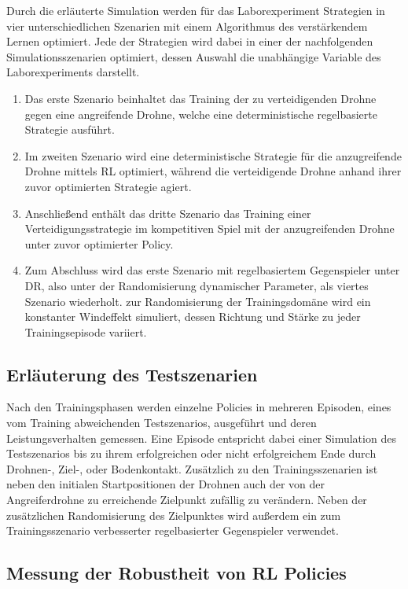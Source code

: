 Durch die erläuterte Simulation werden für das Laborexperiment Strategien in vier unterschiedlichen Szenarien mit einem Algorithmus des verstärkendem Lernen optimiert.
Jede der Strategien wird dabei in einer der nachfolgenden Simulationsszenarien optimiert, dessen Auswahl die unabhängige Variable des Laborexperiments darstellt.
\begin{enumerate}
    \item Das erste Szenario beinhaltet das Training der zu verteidigenden Drohne gegen eine angreifende Drohne, welche eine deterministische regelbasierte Strategie ausführt.
    \item Im zweiten Szenario wird eine deterministische Strategie für die anzugreifende Drohne mittels RL optimiert, während die verteidigende Drohne anhand ihrer zuvor optimierten Strategie agiert.
    \item Anschließend enthält das dritte Szenario das Training einer Verteidigungsstrategie im kompetitiven Spiel mit der anzugreifenden Drohne unter zuvor optimierter Policy.
    \item Zum Abschluss wird das erste Szenario mit regelbasiertem Gegenspieler unter DR, also unter der Randomisierung dynamischer Parameter, als viertes Szenario wiederholt. 
    zur Randomisierung der Trainingsdomäne wird ein konstanter Windeffekt simuliert, dessen Richtung und Stärke zu jeder Trainingsepisode variiert. 
\end{enumerate}

\subsection{Erläuterung des Testszenarien}

Nach den Trainingsphasen werden einzelne Policies in mehreren Episoden, eines vom Training abweichenden Testszenarios, ausgeführt und deren Leistungsverhalten gemessen.
Eine Episode entspricht dabei einer Simulation des Testszenarios bis zu ihrem erfolgreichen oder nicht erfolgreichem Ende durch Drohnen-, Ziel-, oder Bodenkontakt.
Zusätzlich zu den Trainingsszenarien ist neben den initialen Startpositionen der Drohnen auch der von der Angreiferdrohne zu erreichende Zielpunkt zufällig zu verändern.
Neben der zusätzlichen Randomisierung des Zielpunktes wird außerdem ein zum Trainingsszenario verbesserter regelbasierter Gegenspieler verwendet.

\subsection{Messung der Robustheit von RL Policies}


